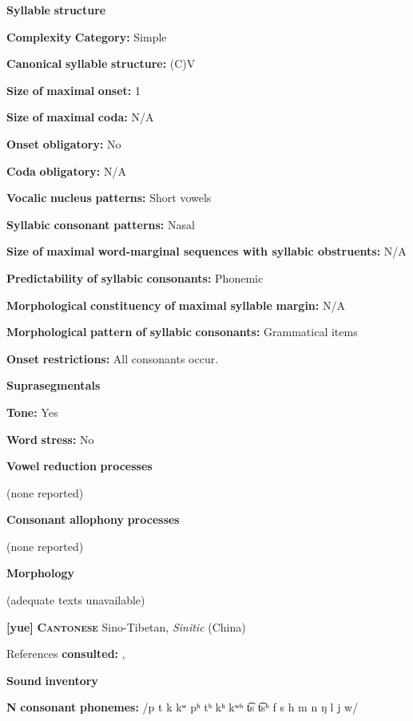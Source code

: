 \begin{styleBody}
\textbf{Syllable} \textbf{structure}

\textbf{Complexity} \textbf{Category:} Simple

\textbf{Canonical} \textbf{syllable} \textbf{structure:} (C)V \citep[6]{Bamgbose1966}

\textbf{Size} \textbf{of} \textbf{maximal} \textbf{onset:} 1

\textbf{Size} \textbf{of} \textbf{maximal} \textbf{coda:} N/A

\textbf{Onset} \textbf{obligatory:} No

\textbf{Coda} \textbf{obligatory:} N/A

\textbf{Vocalic} \textbf{nucleus} \textbf{patterns:} Short vowels

\textbf{Syllabic} \textbf{consonant} \textbf{patterns:} Nasal

\textbf{Size} \textbf{of} \textbf{maximal} \textbf{word{}-marginal sequences with syllabic obstruents:} N/A

\textbf{Predictability} \textbf{of} \textbf{syllabic} \textbf{consonants:} Phonemic

\textbf{Morphological} \textbf{constituency} \textbf{of} \textbf{maximal} \textbf{syllable} \textbf{margin:} N/A

\textbf{Morphological} \textbf{pattern} \textbf{of} \textbf{syllabic} \textbf{consonants:} Grammatical items

\textbf{Onset} \textbf{restrictions:} All consonants occur.

\textbf{Suprasegmentals}

\textbf{Tone:} Yes

\textbf{Word} \textbf{stress:} No

\textbf{Vowel} \textbf{reduction} \textbf{processes}

(none reported)

\textbf{Consonant} \textbf{allophony} \textbf{processes}

(none reported) 

\textbf{Morphology}

(adequate texts unavailable)

\textbf{[yue]}   \textbf{\textsc{Cantonese}}  Sino-Tibetan, \textit{Sinitic} (China)

References \textbf{consulted:} \citet{BauerBenedict1997}, \citet{MatthewsYip1994}

\textbf{Sound} \textbf{inventory}

\textbf{N} \textbf{consonant} \textbf{phonemes:} /p t k kʷ pʰ tʰ kʰ kʷʰ t͡s t͡sʰ f s h m n ŋ l j w/


\end{styleBody}
